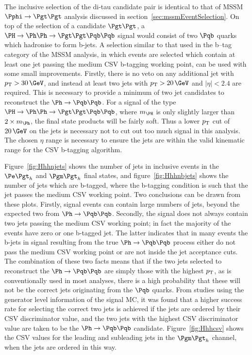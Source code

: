 The inclusive selection of the di-tau candidate pair is identical to that of
\ac{MSSM} $\Pphi\to\Pgt\Pgt$ analysis discussed in
section~\ref{sec:mssmEventSelection}. On top of the selection of a candidate
$\Pgt\Pgt$, a $\PH \to \Ph\Ph \to \Pgt\Pgt \Pqb\Pqb$ signal would consist of two
$\Pqb$ quarks which hadronise to form b-jets. A selection similar to that
used in the b--tag category of the \ac{MSSM} analysis, in which events are 
selected which contain at least one jet passing the medium \ac{CSV} b-tagging working
point, can be used with some small improvements. Firstly, there is no veto on any additional 
jet with $\pt>30\,\GeV$, and instead at least two jets with $\pt>20\,\GeV$ and
$|\eta|<2.4$ are required. This is necessary to provide a minimum of two jet
candidates to reconstruct the $\Ph\to\Pqb\Pqb$. For a signal of the type $\PH\to\Ph\Ph\to\Pgt\Pgt\Pqb\Pqb$, 
where $m_{\PH}$ is only slightly larger than $2\times m_{\Ph}$, the final state 
products will be fairly soft. Thus a lower $p_{\mathrm{T}}$ cut of $20\,\GeV$ on the jets
is necessary not to cut out too much signal in this analysis. The chosen $\eta$ range is necessary to
ensure the jets are within the valid kinematic range for the \ac{CSV} b-tagging
algorithm. 

Figure~\ref{fig:Hhhnjets} shows the number of jets in inclusive
events in the $\etau$ and $\mutau$ final states, and figure~\ref{fig:Hhhnbjets}
shows the number of jets which are b-tagged, where the b-tagging condition
is such that the jet passes the medium \ac{CSV} working point. Two conclusions can be
drawn from these plots. Firstly, signal events can contain large numbers of
jets, beyond the expected two from $\Ph\to\Pqb\Pqb$. 
Secondly, the signal does not always contain two jets passing the medium
\ac{CSV} working point; in fact the majority of the events have zero or one b-tagged
jet. The latter indicates that in many events the b-jets in signal resulting
from the true $\Ph\to\Pqb\Pqb$ process either do not pass the medium \ac{CSV}
working point or are not inside the jet acceptance cuts. The combination of these two
facts means that if the two jets selected to reconstruct the $\Ph\to\Pqb\Pqb$ 
are simply those with the highest $p_{\mathrm{T}}$, as is conventionally used in most analyses, 
there is a high probability that these will not be the correct jets originating from the $\Pqb$ quarks. 
From studies using the generator level information of the signal \ac{MC}, 
it was found that a higher success rate for selecting the
correct two jets is achieved if the jets are ordered by their \ac{CSV}
discriminator value, and the two jets with the highest \ac{CSV} discriminator
value are taken to be the $\Ph\to\Pqb\Pqb$ candidate. Figure~\ref{fig:Hhhcsv} 
shows the \ac{CSV} values for the leading and subleading
jets in the $\mutau$ channel, when the jets are ordered in this way.

